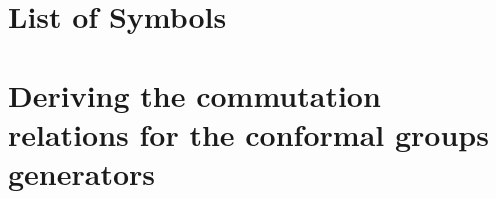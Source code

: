\chapter{List of Symbols} \label{App:Symbols}

\chapter{Deriving the commutation relations for the conformal groups generators}




